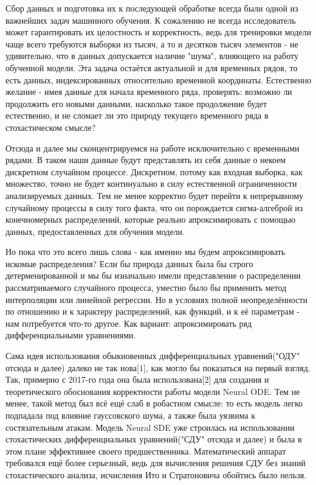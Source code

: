 \documentclass{article}
\begin{document}
   \par Сбор данных и подготовка их к последующей обработке всегда были одной из важнейших задач машинного обучения. К сожалению не всегда исследователь может гарантировать их целостность и корректность, ведь для тренировки модели чаще всего требуются выборки из тысяч, а то и десятков тысяч элементов - не удивительно, что в данных допускается наличие "шума", влияющего на работу обученной модели. Эта задача остаётся актуальной и для временных рядов, то есть данных, индексированных относительно временной координаты. Естественно желание - имея данные для начала временного ряда, проверять: возможно ли продолжить его новыми данными, насколько такое продолжение будет естественно, и не сломает ли это природу текущего временного ряда в стохастическом смысле?
   \par Отсюда и далее мы сконцентрируемся на работе исключительно с временными рядами. В таком наши данные будут представлять из себя данные о некоем дискретном случайном процессе. Дискретном, потому как входная выборка, как множество, точно не будет континуально в силу естественной ограниченности анализируемых данных. Тем не менее корректно будет перейти к непрерывному случайному процессы в силу того факта, что он порождается сигма-алгеброй из конечномерных распределений, которые реально апроксимировать с помощью данных, предоставленных для обучения модели.
   \par Но пока что это всего лишь слова - как именно мы будем апроксимировать искомые распределения? Если бы природа данных была бы строго детерменированной и мы бы изначально имели представление о распределении рассматриваемого случайного процесса, уместно было бы применить метод интерполяции или линейной регрессии. Но в условиях полной неопределённости по отношению и к характеру распределений, как функций, и к её параметрам - нам потребуется что-то другое. Как вариант: апроксимировать ряд дифференциальными уравнениями.
   \par Сама идея использования обыкновенных дифференциальных уравнений("ОДУ" отсюда и далее) далеко не так нова[1], как могло бы показаться на первый взгляд. Так, примерно с 2017-го года она была использована[2] для создания и теоретического обоснования корректности работы модели Neural ODE. Тем не менее, такой метод был всё ещё слаб в робастном смысле: то есть модель легко подпадала под влияние гауссовского шума, а также была уязвима к состязательным атакам. Модель Neural SDE уже строилась на использовании стохастических дифференциальных уравнений("СДУ" отсюда и далее) и была в этом плане эффективнее своего предшественника. Математический аппарат требовался ещё более серьезный, ведь для вычисления решения СДУ без знаний стохастического анализа, исчисления Ито и Стратоновича обойтись было нельзя.
\end{document}
